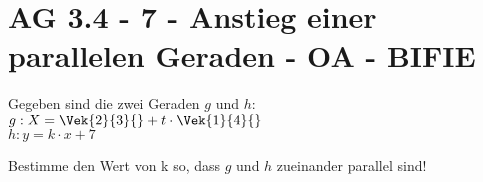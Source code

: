 \section{AG 3.4 - 7 - Anstieg einer parallelen Geraden - OA - BIFIE}

\begin{beispiel}[AG 3.4]{1} %
Gegeben sind die zwei Geraden $g$ und $h$:\\

$g:X=\Vek{2}{3}{}+t\cdot\Vek{1}{4}{}$\\

$h:y=k\cdot x+7$

Bestimme den Wert von k so, dass $g$ und $h$ zueinander parallel sind!

\end{beispiel}